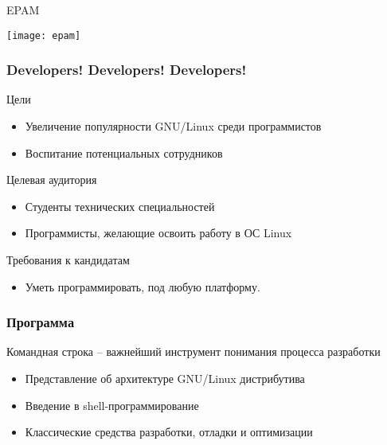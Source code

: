 \begin{frame}{EPAM}
  \begin{center}
    \texttt{[image: epam]}
  \end{center}
\end{frame}

\begin{frame}{}
	\Huge
\end{frame}


\begin{frame}
	\frametitle{Developers! Developers! Developers!}

	\begin{block}{Цели}
		\begin{itemize}
			\item Увеличение популярности GNU/Linux среди программистов
			\item Воспитание потенциальных сотрудников
		\end{itemize}
	\end{block}

	\pause

	\begin{block}{Целевая аудитория}
		\begin{itemize}
			\item Студенты технических специальностей
			\item Программисты, желающие освоить работу в ОС Linux
		\end{itemize}
	\end{block}

	\begin{block}{Требования к кандидатам}
		\begin{itemize}
			\item Уметь программировать, под любую платформу.
		\end{itemize}
	\end{block}
\end{frame}

\begin{frame}
	\frametitle{Программа}

	\begin{block}{Командная строка -- важнейший инструмент понимания процесса разработки}
		\begin{itemize}
			\item Представление об архитектуре GNU/Linux дистрибутива
			\item Введение в shell-программирование
			\item Классические средства разработки, отладки и оптимизации
		\end{itemize}
	\end{block}
\end{frame}

